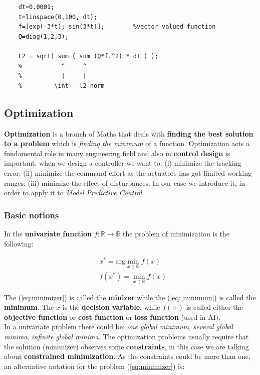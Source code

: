 {\color{blue}
\begin{verbatim}
    dt=0.0001; 
    t=linspace(0,100, dt);  
    f=[exp(-3*t); sin(3*t)];        %vector valued function 
    Q=diag(1,2,3); 
    
    L2 = sqrt( sum ( sum (Q*f.^2) * dt ) );
    %           ^     ^
    %           |     |
    %         \int   l2-norm
\end{verbatim}

}


\subsection{Optimization}
\textbf{Optimization} is a branch of Maths that deals with \textbf{finding the best solution to a problem} which is \textit{finding the minimum} of a function. Optimization acts a fundamental role in many engineering field and also in \textbf{control design} is important: when we design a controller we want to: (i) minimize the tracking error; (ii) minimize the command effort as the actuators has got limited working ranges; (iii) minimize the effect of disturbances. In our case we introduce it, in order to apply it to \textit{Model Predictive Control}.

{\color{blue}\subsubsection{Basic notions}}
In the \textbf{univariate function} $f: \mathbb{R}\to\mathbb{R}$ the problem of minimization is the following: 
{\large{

\begin{align}
   &x^*=\text{arg}\min_{x\in\mathbb{R}} f(x) \label{eq:minimizer}\\
    &f(x^*)=\min_{x\in\mathbb{R}} f(x) \label{eq: minimum}
\end{align}

}}

The (\ref{eq:minimizer}) is called the \textbf{minizer} while the (\ref{eq: minimum}) is called the \textbf{minimum}. The $x$ is the \textbf{decision variable}, while $f(\diamond)$ is called either the \textbf{objective function} or \textbf{cost function} or \textbf{loss function} (used in AI).\\
In a univariate problem there could be: \textit{one global minimum}, \textit{several global minima}, \textit{infinite global minima}. The optimization problems usually require that the solution (minimizer) observes some \textbf{constraints}, in this case we are talking about \textbf{constrained minimization}. As the constraints could be more than one, an alternative notation for the problem (\ref{eq:minimizer}) is:

